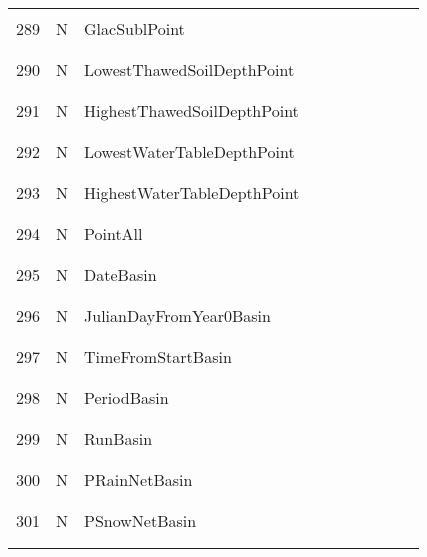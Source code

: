 \begin{longtable}{|c|c|l|c|c|c|c|p{}|c|p{}|}
&&&&&&&&&\\
289 & N & GlacSublPoint & & & & & & & \\
&&&&&&&&&\\\hline%
&&&&&&&&&\\
290 & N & LowestThawedSoilDepthPoint & & & & & & & \\
&&&&&&&&&\\\hline%
&&&&&&&&&\\
291 & N & HighestThawedSoilDepthPoint & & & & & & & \\
&&&&&&&&&\\\hline%
&&&&&&&&&\\
292 & N & LowestWaterTableDepthPoint & & & & & & & \\
&&&&&&&&&\\\hline%
&&&&&&&&&\\
293 & N & HighestWaterTableDepthPoint & & & & & & & \\
&&&&&&&&&\\\hline%
&&&&&&&&&\\
294 & N & PointAll & & & & & & & \\
&&&&&&&&&\\\hline%
&&&&&&&&&\\
295 & N & DateBasin & & & & & & & \\
&&&&&&&&&\\\hline%
&&&&&&&&&\\
296 & N & JulianDayFromYear0Basin & & & & & & & \\
&&&&&&&&&\\\hline%
&&&&&&&&&\\
297 & N & TimeFromStartBasin & & & & & & & \\
&&&&&&&&&\\\hline%
&&&&&&&&&\\
298 & N & PeriodBasin & & & & & & & \\
&&&&&&&&&\\\hline%
&&&&&&&&&\\
299 & N & RunBasin & & & & & & & \\
&&&&&&&&&\\\hline%
&&&&&&&&&\\
300 & N & PRainNetBasin & & & & & & & \\
&&&&&&&&&\\\hline%
&&&&&&&&&\\
301 & N & PSnowNetBasin & & & & & & & \\
&&&&&&&&&\\\hline%
&&&&&&&&&\\

\end{longtable}
